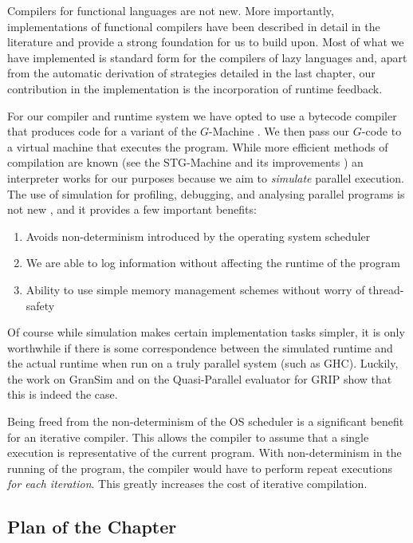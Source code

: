 Compilers for functional languages are not new. More importantly,
implementations of functional compilers have been described in detail in the
literature and provide a strong foundation for us to build upon. Most of what
we have implemented is standard form for the compilers of lazy languages and,
apart from the automatic derivation of strategies detailed in the last chapter,
our contribution in the implementation is the incorporation of runtime
feedback.

For our compiler and runtime system we have opted to use a bytecode compiler
that produces code for a variant of the $G$-Machine
\citep{Augustsson:LazyMLCompiler}. We then pass our $G$-code to a virtual
machine that executes the program. While more efficient methods of compilation
are known (see the STG-Machine and its improvements
\citep{jones1992implementing, marlow2006making}) an interpreter works for our
purposes because we aim to \emph{simulate} parallel execution.  The use of
simulation for profiling, debugging, and analysing parallel programs is not new
\citep{gransim} , and it provides a few important benefits:

\begin{enumerate}
    \item Avoids non-determinism introduced by the operating system scheduler
    \item We are able to log information without affecting the runtime of the
            program
    \item Ability to use simple memory management schemes without worry of
            thread-safety
\end{enumerate}

Of course while simulation makes certain implementation tasks simpler, it is
only worthwhile if there is some correspondence between the simulated runtime
and the actual runtime when run on a truly parallel system (such as GHC).
Luckily, the work on GranSim and on the Quasi-Parallel evaluator for GRIP
\citep{GRIP} show that this is indeed the case.

Being freed from the non-determinism of the OS scheduler is a significant
benefit for an iterative compiler. This allows the compiler to assume that a
single execution is representative of the current program. With non-determinism
in the running of the program, the compiler would have to perform repeat
executions \emph{for each iteration}.  This greatly increases the cost of
iterative compilation.

\subsection*{Plan of the Chapter}

